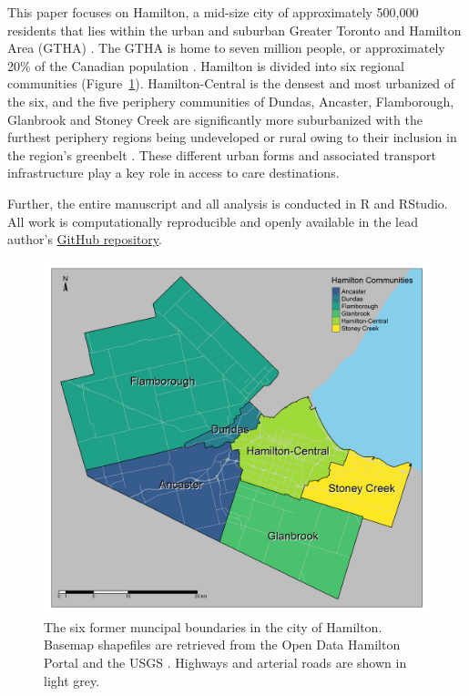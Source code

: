 \documentclass[
  authoryear,
  preprint,
  3p]{elsarticle}
\begin{document}
This paper focuses on Hamilton, a mid-size city of approximately 500,000
residents that lies within the urban and suburban Greater Toronto and
Hamilton Area (GTHA) \citep{transportationtomorrowsurvey2018}. The GTHA
is home to seven million people, or approximately 20\% of the Canadian
population \citep{cityoftoronto2021CensusPopulationa2022}. Hamilton is
divided into six regional communities (Figure~\ref{fig-Fig1}).
Hamilton-Central is the densest and most urbanized of the six, and the
five periphery communities of Dundas, Ancaster, Flamborough, Glanbrook
and Stoney Creek are significantly more suburbanized with the furthest
periphery regions being undeveloped or rural owing to their inclusion in
the region's greenbelt
\citep{greenbeltfoundationThrivingGreenbeltThriving2023}. These
different urban forms and associated transport infrastructure play a key
role in access to care destinations.

Further, the entire manuscript and all analysis is conducted in R and
RStudio. All work is computationally reproducible and openly available
in the lead author's \href{XXX}{GitHub repository}.

\begin{figure}

{\centering \includegraphics[width=6.25in,height=\textheight]{figures/Fig1-boundaries.png}

}

\caption{\label{fig-Fig1}The six former muncipal boundaries in the city
of Hamilton. Basemap shapefiles are retrieved from the Open Data
Hamilton Portal \citep{opendatahamiltonCityBoundary2023} and the USGS
\citep{greatlakesUSGS2010}. Highways and arterial roads are shown in
light grey.}

\end{figure}
\end{document}
